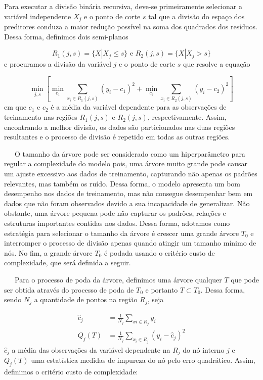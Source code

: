 \documentclass[
  12pt,
  letterpaper,
  DIV=11,
  numbers=noendperiod]{scrreprt}
\begin{document}
\vspace{12pt}

Para executar a divisão binária recursiva, deve-se primeiramente
selecionar a variável independente \(X_j\) e o ponto de corte \(s\) tal
que a divisão do espaço dos preditores conduza a maior redução possível
na soma dos quadrados dos resíduos. Dessa forma, definimos dois
semi-planos

\[
R_{1}\left(j, s\right) = \{X | X_j \leq s\} \text{ e } R_{2}\left(j, s\right) = \{X | X_j > s\}
\] e procuramos a divisão da variável \(j\) e o ponto de corte \(s\) que
resolve a equação

\[
\min_{j, s}\left[\min_{c_1} \sum_{x_i \in R_1\left(j, s\right)} \left(y_i - c_{1}\right)^2 + \min_{c_2} \sum_{x_i \in R_2\left(j, s\right)} \left(y_i - c_{2}\right)^2\right]
\] em que \(c_1\) e \(c_2\) é a média da variável dependente para as
observações de treinamento nas regiões \(R_1\left(j, s\right)\) e
\(R_2\left(j, s\right)\), respectivamente. Assim, encontrando a melhor
divisão, os dados são particionados nas duas regiões resultantes e o
processo de divisão é repetido em todas as outras regiões.

\vspace{12pt}

~~~O tamanho da árvore pode ser considerado como um hiperparâmetro para
regular a complexidade do modelo pois, uma árvore muito grande pode
causar um ajuste excessivo aos dados de treinamento, capturando não
apenas os padrões relevantes, mas também os ruído. Dessa forma, o modelo
apresenta um bom desempenho nos dados de treinamento, mas não consegue
desempenhar bem em dados que não foram observados devido a sua
incapacidade de generalizar. Não obstante, uma árvore pequena pode não
capturar os padrões, relações e estruturas importantes contidas nos
dados. Dessa forma, adotamos como estratégia para selecionar o tamanho
da árvore é crescer uma grande árvore \(T_0\) e interromper o processo
de divisão apenas quando atingir um tamanho mínimo de nós. No fim, a
grande árvore \(T_0\) é podada usando o critério custo de complexidade,
que será definida a seguir.

\vspace{12pt}

~~~Para o processo de poda da árvore, definimos uma árvore qualquer
\(T\) que pode ser obtida através do processo de poda de \(T_0\) e
portanto \(T \subset T_0\). Dessa forma, sendo \(N_j\) a quantidade de
pontos na região \(R_j\), seja

\[
\begin{aligned}
\hat{c}_j &= \frac{1}{N_j}\sum_{xi \in R_j} y_i \\
Q_j\left(T\right) &= \frac{1}{N_j} \sum_{x_i \in R_j}\left(y_i - \hat{c}_j\right)^2
\end{aligned}
\] \(\hat{c}_j\) a média das observações da variável dependente na
\(R_j\) do nó interno \(j\) e \(Q_j\left(T\right)\) uma estatística
medidas de impureza do nó pelo erro quadrático. Assim, definimos o
critério custo de complexidade:
\end{document}
